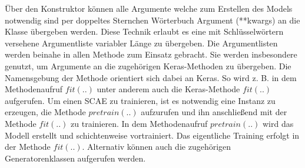     Über den Konstruktor können alle Argumente welche zum Erstellen des Models notwendig sind per doppeltes Sternchen Wörterbuch Argument (**kwargs) an die Klasse übergeben werden. Diese Technik erlaubt es eine mit Schlüsselwörtern versehene Argumentliste variabler Länge zu übergeben. Die Argumentlisten werden beinahe in allen Methode zum Einsatz gebracht. Sie werden insbesondere genutzt, um Argumente an die zugehörigen Keras-Methoden zu übergeben. Die Namensgebung der Methode orientiert sich dabei an Keras. So wird z. B. in dem Methodenaufruf $fit(..)$ unter anderem auch die Keras-Methode  $fit(..)$ aufgerufen. Um einen SCAE zu trainieren, ist es notwendig eine Instanz zu erzeugen, die Methode $pretrain(..)$ aufzurufen und ihn anschließend mit der Methode $fit(..)$ zu trainieren.
    In dem Methodenaufruf $pretrain(..)$ wird das Modell erstellt und schichtenweise vortrainiert. Das eigentliche Training erfolgt in der Methode $fit(..)$. Alternativ können auch die zugehörigen Generatorenklassen aufgerufen werden.    
    
